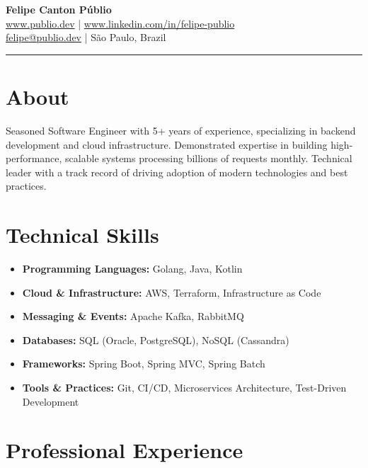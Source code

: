 \documentclass[a4paper,10pt]{article}
\begin{document}
\pagestyle{empty}

\begin{center}
    {\Huge \textbf{Felipe Canton Públio}} \\
    \vspace{4mm}
    \href{https://www.publio.dev}{www.publio.dev} | \href{https://www.linkedin.com/in/felipe-publio}{www.linkedin.com/in/felipe-publio} \\
    \vspace{2mm}
    \href{mailto:felipe@publio.dev}{felipe@publio.dev} | São Paulo, Brazil
\end{center}

\vspace{3mm}
\hrule
\vspace{3mm}

\section*{About}
Seasoned Software Engineer with 5+ years of experience, specializing in backend development and cloud infrastructure. Demonstrated expertise in building high-performance, scalable systems processing billions of requests monthly. Technical leader with a track record of driving adoption of modern technologies and best practices.

\section*{Technical Skills}
\begin{itemize}[leftmargin=*]
    \item \textbf{Programming Languages:} Golang, Java, Kotlin
    \item \textbf{Cloud \& Infrastructure:} AWS, Terraform, Infrastructure as Code
    \item \textbf{Messaging \& Events:} Apache Kafka, RabbitMQ
    \item \textbf{Databases:} SQL (Oracle, PostgreSQL), NoSQL (Cassandra)
    \item \textbf{Frameworks:} Spring Boot, Spring MVC, Spring Batch
    \item \textbf{Tools \& Practices:} Git, CI/CD, Microservices Architecture, Test-Driven Development
\end{itemize}

\section*{Professional Experience}
\end{document}
